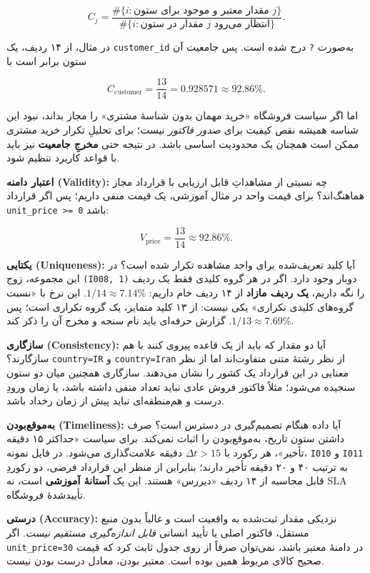 \documentclass[12pt,a4paper,oneside]{book}
\begin{document}
\[
C_j=\frac{\#\{i:\text{مقدار معتبر و موجود برای ستون }j\}}{\#\{i:\text{مقدار در ستون }j\text{ انتظار می‌رود}\}}.
\]

در مثال، از ۱۴ ردیف، یک \texttt{customer\_id} به‌صورت \texttt{?} درج شده است. پس جامعیت آن ستون برابر است با

\[
C_{\mathrm{customer}}=\frac{13}{14}=0.928571\approx92.86\%.
\]

اما اگر سیاست فروشگاه «خرید مهمان بدون شناسهٔ مشتری» را مجاز بداند، نبود این شناسه همیشه نقص کیفیت برای \emph{صدور فاکتور} نیست؛ برای تحلیلِ تکرار خرید مشتری ممکن است همچنان یک محدودیت اساسی باشد. در نتیجه حتی \textbf{مخرجِ جامعیت} نیز باید با قواعد کاربرد تنظیم شود.

\textbf{اعتبار دامنه (Validity):} چه نسبتی از مشاهداتِ قابل ارزیابی با قرارداد مجاز هماهنگ‌اند؟ برای قیمت واحد در مثال آموزشی، یک قیمت منفی داریم؛ پس اگر قرارداد \texttt{unit\_price\ \textgreater{}=\ 0} باشد:

\[
V_{\mathrm{price}}=\frac{13}{14}\approx92.86\%.
\]

\textbf{یکتایی (Uniqueness):} آیا کلید تعریف‌شده برای واحد مشاهده تکرار شده است؟ در این مجموعه، زوج \texttt{(I008,\ 1)} دوبار وجود دارد. اگر در هر گروه کلیدی فقط یک ردیف را نگه داریم، \textbf{یک ردیف مازاد} از ۱۴ ردیف خام داریم: \(1/14\approx7.14\%\). این نرخ با «نسبت گروه‌های کلیدی تکراری» یکی نیست: از ۱۳ کلید متمایز، یک گروه تکراری است؛ پس \(1/13\approx7.69\%\). گزارش حرفه‌ای باید نام سنجه و مخرج آن را ذکر کند.

\textbf{سازگاری (Consistency):} آیا دو مقدار که باید از یک قاعده پیروی کنند با هم سازگارند؟ \texttt{country=IR} و \texttt{country=Iran} از نظر رشتهٔ متنی متفاوت‌اند اما از نظر معنایی در این قرارداد یک کشور را نشان می‌دهند. سازگاری همچنین میان دو ستون سنجیده می‌شود؛ مثلاً فاکتور فروش عادی نباید تعداد منفی داشته باشد، یا زمان ورودِ درست و هم‌منطقه‌ای نباید پیش از زمان رخداد باشد.

\textbf{به‌موقع‌بودن (Timeliness):} آیا داده هنگام تصمیم‌گیری در دسترس است؟ صرف داشتن ستون تاریخ، به‌موقع‌بودن را اثبات نمی‌کند. برای سیاست «حداکثر ۱۵ دقیقه تأخیر»، هر رکورد با \(\Delta t>15\) دقیقه علامت‌گذاری می‌شود. در فایل نمونه، \texttt{I010} و \texttt{I011} به ترتیب ۴۰ و ۲۰ دقیقه تأخیر دارند؛ بنابراین از منظر این قرارداد فرضی، دو رکوردِ قابل محاسبه از ۱۴ ردیف «دیررس» هستند. این یک \textbf{آستانهٔ آموزشی} است، نه SLA تأییدشدهٔ فروشگاه.

\textbf{درستی (Accuracy):} نزدیکی مقدار ثبت‌شده به واقعیت است و غالباً بدون منبع مستقل، فاکتور اصلی یا تأیید انسانی \emph{قابل اندازه‌گیری مستقیم نیست}. اگر \texttt{unit\_price=30} در دامنهٔ معتبر باشد، نمی‌توان صرفاً از روی جدول ثابت کرد که قیمت صحیح کالای مربوط همین بوده است. معتبر بودن، معادل درست بودن نیست.
\end{document}
